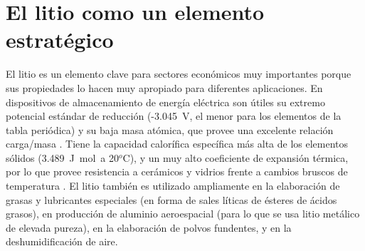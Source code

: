 \section{El litio como un elemento estratégico}
El litio es un elemento clave para sectores económicos muy importantes porque sus propiedades lo hacen muy apropiado para diferentes aplicaciones. En dispositivos de almacenamiento de energía eléctrica son útiles su extremo potencial estándar de reducción (-3.045~V, el menor para los elementos de la tabla periódica) y su baja masa atómica, que provee una excelente relación carga/masa \citep{Bagotsky2006}. Tiene la capacidad calorífica específica más alta de los elementos sólidos (3.489~J~mol\mnn\ a 20$^o$C), y un muy alto coeficiente de expansión térmica, por lo que provee resistencia a cerámicos y vidrios frente a cambios bruscos de temperatura \citep{Hart1973}. El litio también es utilizado ampliamente en la elaboración de grasas y lubricantes especiales (en forma de sales líticas de ésteres de ácidos grasos), en producción de aluminio aeroespacial (para lo que se usa litio metálico de elevada pureza), en la elaboración de polvos fundentes, y en la deshumidificación de aire.

